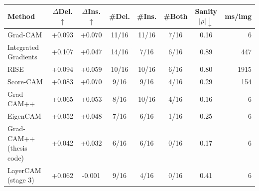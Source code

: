 \begin{tabular}{@{}lccccccr@{}}
\toprule
Method & $\Delta$Del.$\uparrow$ & $\Delta$Ins.$\uparrow$ & \#Del. & \#Ins. & \#Both & Sanity $|\rho|\downarrow$ & ms/img \\
\midrule
Grad-CAM & +0.093 & +0.070 & 11/16 & 11/16 & 7/16 & 0.16 & 6 \\
Integrated Gradients & +0.107 & +0.047 & 14/16 & 7/16 & 6/16 & 0.89 & 447 \\
RISE & +0.094 & +0.059 & 10/16 & 10/16 & 6/16 & 0.80 & 1915 \\
Score-CAM & +0.083 & +0.070 & 9/16 & 9/16 & 4/16 & 0.29 & 154 \\
Grad-CAM++ & +0.065 & +0.053 & 8/16 & 10/16 & 4/16 & 0.16 & 6 \\
EigenCAM & +0.052 & +0.048 & 7/16 & 6/16 & 1/16 & 0.25 & 6 \\
Grad-CAM++ (thesis code) & +0.042 & +0.032 & 6/16 & 6/16 & 0/16 & 0.17 & 6 \\
LayerCAM (stage 3) & +0.062 & -0.001 & 9/16 & 4/16 & 0/16 & 0.41 & 6 \\
\bottomrule
\end{tabular}